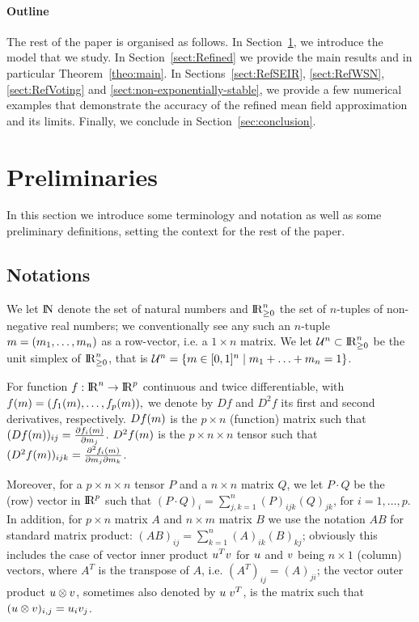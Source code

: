 \documentclass[review]{elsarticle}
\begin{document}
\paragraph*{Outline} The rest of the paper is organised as follows. In
Section~\ref{sect:preliminaries}, we introduce the model that we
study. In Section~\ref{sect:Refined} we provide the main results and
in particular Theorem~\ref{theo:main}. In Sections~\ref{sect:RefSEIR},
\ref{sect:RefWSN}, \ref{sect:RefVoting} and
\ref{sect:non-exponentially-stable}, we provide a few numerical
examples that demonstrate the accuracy of the refined mean field
approximation and its limits. Finally, we conclude in
Section~\ref{sec:conclusion}.

\section{Preliminaries}
\label{sect:preliminaries}

In this section we introduce some terminology and notation as well as
some preliminary definitions, setting the context for the rest of the
paper.


\subsection{Notations}

We let $\mathrm{I\!N}$ denote the set of natural numbers and $\mathrm{I\!R}_{\geq 0}^n$ the
set of $n$-tuples of non-negative real numbers; we conventionally see
any such an $n$-tuple $m=(m_1,\ldots,m_n)$ as a row-vector,
i.e. a $1 \times n$ matrix. We let ${\cal U}^n \subset \mathrm{I\!R}_{\geq 0}^n$ be the
unit simplex of $\mathrm{I\!R}_{\geq 0}^n$, that is
${\cal U}^n=\{m \in [0,1]^n \;|\; m_1 + \ldots +m_n =1\}$.

For function $f :\mathrm{I\!R}^n \rightarrow \mathrm{I\!R}^p$ continuous and twice
differentiable, with
$ f(m) = (f_1(m), \ldots, f_p(m)), $ we denote by $Df$
and $D^2f$ its first and second derivatives, respectively. $D f (m)$ is the
$p \times n$ (function) matrix such that
$(D f (m))_{ij} = \frac{\partial f_i(m)}{\partial m_j}$.
$D^2 f (m)$ is the $p \times n \times n$ tensor such that
$(D^2 f (m))_{ijk} = \frac{\partial^2 f_i(m)}{\partial
  m_j\partial m_k}$.

Moreover, for a $p \times n \times n$ tensor $P$ and a $n \times n$
matrix $Q$, we let $P \cdot Q$ be the (row) vector in $\mathrm{I\!R}^p$ such
that $(P \cdot Q)_i = \sum_{j,k=1}^n (P)_{ijk}(Q)_{jk}$, for
$i=1,\ldots, p$.  In addition, for $p \times n$ matrix $A$ and
$n \times m$ matrix $B$ we use the notation $AB$ for standard matrix
product: $(AB)_{ij} = \sum_{k=1}^n (A)_{ik}(B)_{kj}$; obviously this
includes the case of vector inner product $u^T v$ for
$u$ and $v$ being $n \times 1$ (column) vectors, where $A^T$
is the transpose of $A$, i.e. $(A^T)_{ij}=(A)_{ji}$; the vector outer
product $u \otimes v$, sometimes also denoted by
$u \;v^T$, is the matrix such that
$(u \otimes v)_{i,j} = u_iv_j$.
\end{document}
